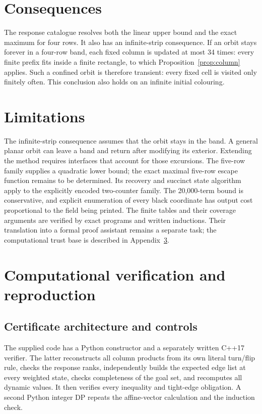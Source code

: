 \documentclass[11pt]{article}
\theoremstyle{definition}\newtheorem{definition}[theorem]{Definition}
\begin{document}
\section{Consequences}
The response catalogue resolves both the linear upper bound and the exact
maximum for four rows. It also has an infinite-strip consequence. If an orbit
stays forever in a four-row band, each fixed column is updated at most 34
times: every finite prefix fits inside a finite rectangle, to which
Proposition~\ref{prop:column} applies. Such a confined orbit is therefore
transient: every fixed cell is visited only finitely often. This conclusion
also holds on an infinite initial colouring.

\section{Limitations}
The infinite-strip consequence assumes that the orbit stays in the band.
A general planar orbit can leave a band and return after modifying its
exterior. Extending the method requires interfaces that account for those
excursions. The five-row family supplies a quadratic lower bound; the exact maximal
five-row escape function remains to be determined. Its recovery and succinct
state algorithm apply to the explicitly encoded two-counter family. The
20,000-term bound is conservative, and explicit enumeration of every black
coordinate has output cost proportional to the field being printed. The finite tables and their coverage arguments are verified
by exact programs and written inductions. Their translation into a formal
proof assistant remains a separate task; the computational trust base is
described in Appendix~\ref{app:reproduction}.

\appendix
\section{Computational verification and reproduction}\label{app:reproduction}
\subsection{Certificate architecture and controls}
The supplied code has a Python constructor and a separately written C++17
verifier. The latter reconstructs all column products from its own literal
turn/flip rule, checks the response ranks, independently builds the expected
edge list at every weighted state, checks completeness of the goal set, and
recomputes all dynamic values. It then verifies every inequality and tight-edge
obligation. A second Python integer DP repeats the affine-vector calculation
and the induction check.
\end{document}
